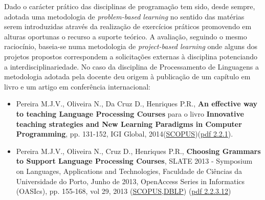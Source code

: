 \documentclass[11pt]{article}
\begin{document}
Dado o carácter prático das disciplinas de programação tem sido, desde sempre, adotada uma metodologia de {\em{ problem-based learning}} no sentido das matérias serem introduzidas através da realização de exercícios práticos promovendo em alturas oportunas o recurso a suporte teórico. A avaliação, seguindo o mesmo raciocínio, baseia-se numa metodologia de {\em{ project-based learning}} onde alguns dos projetos propostos correspondem a solicitações externas à disciplina potenciando a interdisciplinariedade.
No caso da disciplina de Processamento de Linguagens a metodologia adotada pela docente deu origem à publicação de um capítulo em livro e um artigo em conferência internacional:
\begin{itemize}
\item {Pereira M.J.V., Oliveira N., Da Cruz D., Henriques P.R., {\bf{ An effective way to teaching Language Processing Courses}} para o livro {\bf{ Innovative teaching strategies and New Learning Paradigms in Computer Programming}}, pp. 131-152, IGI Global, 2014(\href{run:Publicacoes/PublicacoesSCOPUS.pdf}{SCOPUS})(\href{run:Publicacoes/publicacoes/78.pdf}{pdf 2.2.1}).}
\item {Pereira M.J.V., Oliveira N., Cruz D., Henriques P.R., {\bf{ Choosing Grammars to Support Language Processing Courses}}, SLATE 2013 - Symposium on Languages, Applications and Technologies, Faculdade de Ciências da Universidade do Porto, Junho de 2013, OpenAccess Series in Informatics (OASIcs), pp. 155-168, vol 29, 2013 (\href{run:Publicacoes/PublicacoesSCOPUS.pdf}{SCOPUS},\href{run:Publicacoes/ComprovativosDBLP.pdf}{DBLP}) (\href{run:Publicacoes/publicacoes/71.pdf}{pdf 2.2.3.12})}
\end{itemize}
\end{document}
